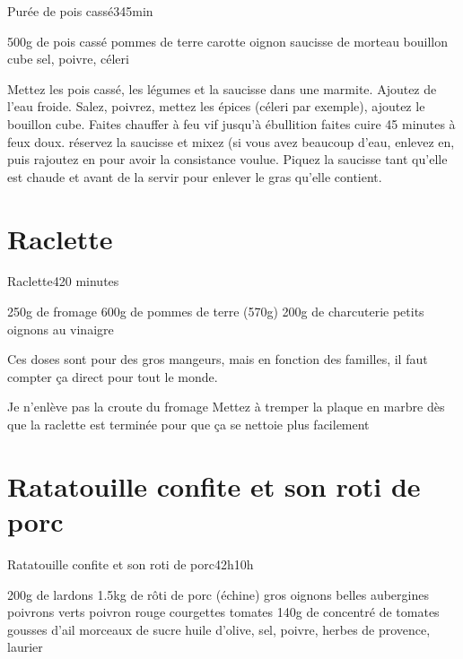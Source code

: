 {\begin{recette}{Purée de pois cassé}{3}{45min}{}
\begin{ingredients}
\ingredient 500g de pois cassé
 pommes de terre
 carotte
 oignon
 saucisse de morteau
 bouillon cube
\ingredient sel, poivre, céleri
\end{ingredients}

\begin{preparation}
\etape Mettez les pois cassé, les légumes et la saucisse dans une marmite. Ajoutez de l'eau froide. Salez, poivrez, mettez les 
épices (céleri par exemple), ajoutez le bouillon cube. 
\etape Faites chauffer à feu vif jusqu'à ébullition
\etape faites cuire 45 minutes à feux doux.
\etape réservez la saucisse et mixez (si vous avez beaucoup d'eau, enlevez en, puis rajoutez en pour avoir la consistance 
voulue.
\etape Piquez la saucisse tant qu'elle est chaude et avant de la servir pour enlever le gras qu'elle contient. 
\end{preparation}

\end{recette}


\section{Raclette}
\begin{recette}{Raclette}{4}{20 minutes}{}
\begin{ingredients}
\ingredient 250g de fromage
\ingredient 600g de pommes de terre (570g)
\ingredient 200g de charcuterie
\ingredient petits oignons au vinaigre
\begin{remarque}
 Ces doses sont pour des gros mangeurs, mais en fonction des familles, il faut compter ça direct pour tout le monde.
\end{remarque}

\end{ingredients}

\begin{preparation}
\etape Je n'enlève pas la croute du fromage
\etape Mettez à tremper la plaque en marbre dès que la raclette est terminée pour que ça se nettoie plus facilement
\end{preparation}
\end{recette}

\section{Ratatouille confite et son roti de porc}
\begin{recette}{Ratatouille confite et son roti de porc}{4}{2h}{10h}
\begin{ingredients}
\ingredient 200g de lardons %
\ingredient 1.5kg de rôti de porc (échine)
 gros oignons
 belles aubergines
 poivrons verts
 poivron rouge
 courgettes
 tomates
\ingredient 140g de concentré de tomates
 gousses d'ail
 morceaux de sucre
\ingredient huile d'olive, sel, poivre, herbes de provence, laurier
\end{ingredients}


\end{recette}}
